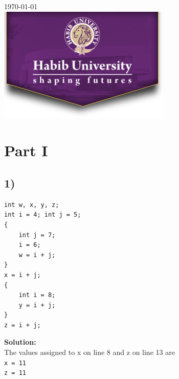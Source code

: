 \documentclass[12pt]{article}
\begin{document}
\begin{titlepage}

{\large \today}\\[2cm] %


\includegraphics{HU_logo_new.png}\\[1cm] %
 

\vfill %

\end{titlepage}



\section{Part I}
\subsection{1)}
    \begin{lstlisting}[style={c-style}]
int w, x, y, z; 
int i = 4; int j = 5;
{ 
    int j = 7;
    i = 6;
    w = i + j;
}
x = i + j;
{ 
    int i = 8;
    y = i + j;
}
z = i + j;

\end{lstlisting}
\begin{framed}
\textbf{Solution:}\\
The values assigned to x on line 8 and z on line 13 are\\
\texttt{x = 11}\\
\texttt{z = 11}
\end{framed}
\end{document}
